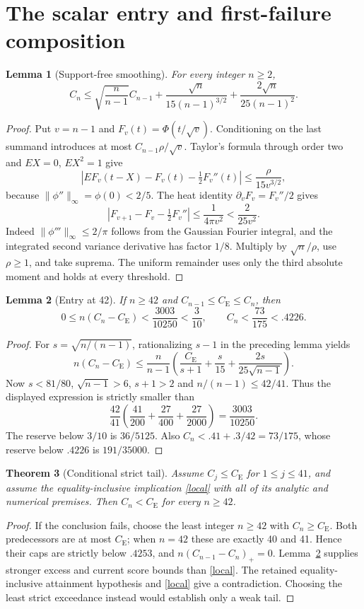 \documentclass[11pt]{article}
\newtheorem{theorem}{Theorem}
\newtheorem{lemma}[theorem]{Lemma}
\newcommand{\CE}{C_{\mathrm E}}
\begin{document}
\section{The scalar entry and first-failure composition}
\begin{lemma}[Support-free smoothing]
For every integer $n\ge2$,
\[
 C_n\le \sqrt{\frac n{n-1}}C_{n-1}
 +\frac{\sqrt n}{15(n-1)^{3/2}}+\frac{2\sqrt n}{25(n-1)^2}.
\]
\end{lemma}
\begin{proof}
Put $v=n-1$ and $F_v(t)=\Phi(t/\sqrt v)$. Conditioning on the last summand
introduces at most $C_{n-1}\rho/\sqrt v$. Taylor's formula through order two
and $EX=0$, $EX^2=1$ give
\[
 \left|EF_v(t-X)-F_v(t)-\tfrac12F_v''(t)\right|
 \le \frac{\rho}{15v^{3/2}},
\]
because $\|\phi''\|_\infty=\phi(0)<2/5$.
The heat identity $\partial_v F_v=F_v''/2$ gives
\[
 \left|F_{v+1}-F_v-\tfrac12F_v''\right|
 \le \frac{1}{4\pi v^2}<\frac{2}{25v^2}.
\]
Indeed $\|\phi'''\|_\infty\le2/\pi$ follows from the Gaussian Fourier
integral, and the integrated second variance derivative has factor $1/8$.
Multiply by $\sqrt n/\rho$, use $\rho\ge1$, and take suprema. The uniform
remainder uses only the third absolute moment and holds at every threshold.
\end{proof}

\begin{lemma}[Entry at 42]\label{entry}
If $n\ge42$ and $C_{n-1}\le\CE\le C_n$, then
\[
 0\le n(C_n-\CE)<\frac{3003}{10250}<\frac3{10},
 \qquad C_n<\frac{73}{175}<.4226 .
\]
\end{lemma}
\begin{proof}
For $s=\sqrt{n/(n-1)}$, rationalizing $s-1$ in the preceding lemma yields
\[
 n(C_n-\CE)\le\frac n{n-1}
 \left(\frac{\CE}{s+1}+\frac{s}{15}
                +\frac{2s}{25\sqrt{n-1}}\right).
\]
Now $s<81/80$, $\sqrt{n-1}>6$, $s+1>2$ and $n/(n-1)\le42/41$.
Thus the displayed expression is strictly smaller than
\[
 \frac{42}{41}\left(\frac{41}{200}
             +\frac{27}{400}+\frac{27}{2000}\right)
 =\frac{3003}{10250}.
\]
The reserve below $3/10$ is $36/5125$. Also
$C_n<.41+.3/42=73/175$, whose reserve below $.4226$ is $191/35000$.
\end{proof}

\begin{theorem}[Conditional strict tail]\label{tail}
Assume $C_j\le\CE$ for $1\le j\le41$, and assume the equality-inclusive
implication \eqref{local} with all of its analytic and numerical premises.
Then $C_n<\CE$ for every $n\ge42$.
\end{theorem}
\begin{proof}
If the conclusion fails, choose the least integer $n\ge42$ with $C_n\ge\CE$.
Both predecessors are at most $\CE$; when $n=42$ these are exactly 40 and 41.
Hence their caps are strictly below $.4253$, and
$n(C_{n-1}-C_n)_+=0$. Lemma~\ref{entry} supplies stronger excess and current
score bounds than \eqref{local}. The retained equality-inclusive attainment
hypothesis and \eqref{local} give a contradiction.
Choosing the least strict exceedance instead would establish only a weak tail.
\end{proof}
\end{document}
